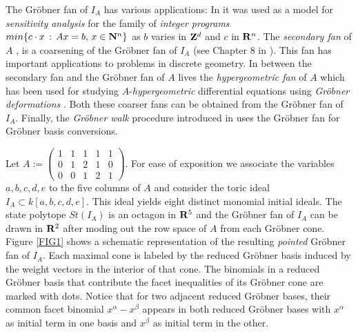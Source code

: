\documentclass[11pt]{article}
\begin{document}
The Gr\"obner fan of $I_A$ has various applications: In \cite{ST} it
was used as a model for {\em sensitivity analysis} for the family 
of {\em integer programs} $min \{ c \cdot x \, :\, Ax = b, \, x \in
{\bf N}^n \}$ as $b$ varies in ${\bf Z}^d$ and $c$ in ${\bf R}^n$.
The {\em secondary fan} of $A$ \cite{BFS}, \cite{GKZ} is a coarsening 
of the Gr\"obner fan of $I_A$ (see Chapter 8 in \cite{Stu}). This fan has
important applications to problems in discrete geometry. In between
the secondary fan and the Gr\"obner fan of $A$ lives the {\em
hypergeometric fan} of $A$ which has been used for studying 
$A$-{\em hypergeometric} differential equations using 
{\em Gr\"obner deformations}
\cite{SST}. Both these coarser fans can be obtained from the Gr\"obner
fan of $I_A$. Finally, the {\em Gr\"obner walk} procedure introduced in
\cite{CKM} uses the Gr\"obner fan for Gr\"obner basis conversions. 

\begin{example}\label{EX1} 
Let $A := \left( \begin{array}{ccccc} 
         1 & 1 & 1 & 1 & 1 \\
         0 & 1 & 2 & 1 & 0 \\
         0 & 0 & 1 & 2 & 1 
\end{array} \right )$. For ease of exposition we associate the
variables $a,b,c,d,e$ to the five columns of $A$ and consider the
toric ideal $I_A \subset k[a,b,c,d,e]$. This ideal
yields eight distinct monomial initial ideals. The state polytope
$St(I_A)$ is an  
octagon in ${\bf R}^5$ and the Gr\"obner fan of $I_A$ can be drawn in
${\bf R}^2$ after moding out the row space of $A$ from each Gr\"obner
cone. Figure \ref{FIG1} shows a schematic representation of the resulting {\em
pointed} Gr\"obner fan of $I_A$. Each maximal cone is labeled by the 
reduced Gr\"obner basis induced by the weight vectors in the 
interior of that cone. The binomials in
a reduced Gr\"obner basis that contribute the facet inequalities of
its Gr\"obner cone are marked with dots. Notice that for two adjacent
reduced Gr\"obner bases, their common facet binomial $x^{\alpha} -
x^{\beta}$ appears in both reduced Gr\"obner bases with 
$x^{\alpha}$ as initial term in one basis and $x^{\beta}$ as 
initial term in the other.
\end{example}
\end{document}
